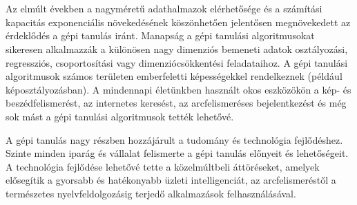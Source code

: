 \section{\bevezetes}


Az elmúlt években a nagyméretű adathalmazok elérhetősége és a számítási kapacitás exponenciális növekedésének köszönhetően jelentősen megnövekedett az érdeklődés a gépi tanulás iránt. Manapság a gépi tanulási algoritmusokat sikeresen alkalmazzák a különösen nagy dimenziós bemeneti adatok osztályozási, regressziós, csoportosítási vagy dimenziócsökkentési feladataihoz. A gépi tanulási algoritmusok számos területen emberfeletti képességekkel rendelkeznek (például képosztályozásban). A mindennapi életünkben használt okos eszközökön a kép- és beszédfelismerést, az internetes keresést, az arcfelismeréses bejelentkezést és még sok mást a gépi tanulási algoritmusok tették lehetővé.


A gépi tanulás nagy részben hozzájárult a tudomány és technológia fejlődéshez. Szinte minden iparág és vállalat felismerte a gépi tanulás előnyeit és lehetőségeit. A technológia fejlődése lehetővé tette a közelmúltbeli áttöréseket, amelyek elősegítik a gyorsabb és hatékonyabb üzleti intelligenciát, az arcfelismeréstől a természetes nyelvfeldolgozásig terjedő alkalmazások felhasználásával.


